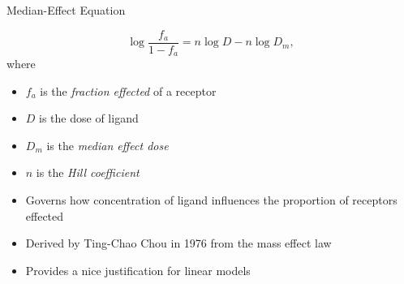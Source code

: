 \documentclass{beamer}
\begin{document}
\begin{frame}{Median-Effect Equation}

    \begin{definition}
        \[
            \log\frac{f_a}{1 - f_a} = n\log D - n \log D_m,
        \]
        where
        \begin{itemize}
            \item $f_a$ is the \textit{fraction effected} of a receptor
            \item $D$ is the dose of ligand
            \item $D_m$ is the \textit{median effect dose}
            \item $n$ is the \textit{Hill coefficient}
        \end{itemize}
    \end{definition}

    \begin{itemize}
        \item Governs how concentration of ligand influences the proportion of receptors effected
        \item Derived by Ting-Chao Chou in 1976 from the mass effect law
        \item Provides a nice justification for linear models
    \end{itemize}
\end{frame}
\end{document}
